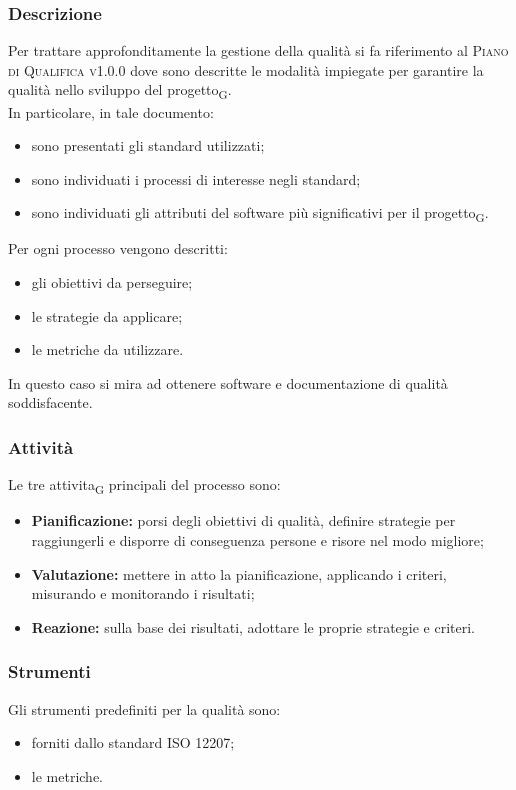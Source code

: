     \subsubsection{Descrizione}
    Per trattare approfonditamente la gestione della qualità si fa riferimento al \textsc{Piano di Qualifica v1.0.0} dove sono descritte le modalità impiegate per garantire la qualità nello sviluppo del \gls{progetto}\textsubscript{G}.\\In particolare, in tale documento:
    \begin{itemize}
    	\item sono presentati gli standard utilizzati;
    	\item sono individuati i processi di interesse negli standard;
    	\item sono individuati gli attributi del software più significativi per il \gls{progetto}\textsubscript{G}.
    \end{itemize}
	Per ogni processo vengono descritti:
	\begin{itemize}
		\item gli obiettivi da perseguire;
		\item le strategie da applicare;
		\item le metriche da utilizzare.
	\end{itemize}
	In questo caso si mira ad ottenere software e documentazione di qualità soddisfacente.
    \subsubsection{Attività}
    Le tre \gls{attivita}\textsubscript{G} principali del processo sono:
    \begin{itemize}
    	\item \textbf{Pianificazione:} porsi degli obiettivi di qualità, definire strategie per raggiungerli e disporre di conseguenza persone e risore nel modo migliore;
    	\item \textbf{Valutazione:} mettere in atto la pianificazione, applicando i criteri, misurando e monitorando i risultati;
    	\item \textbf{Reazione:} sulla base dei risultati, adottare le proprie strategie e criteri.
    \end{itemize}
	\subsubsection{Strumenti}
	Gli strumenti predefiniti per la qualità sono:
	\begin{itemize}
		\item forniti dallo standard ISO 12207;
		\item le metriche.
	\end{itemize}
